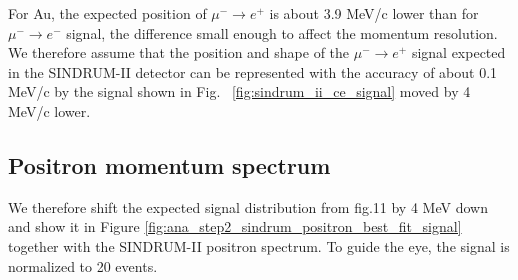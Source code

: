 \documentclass[12pt]{article}
\begin{document}
For Au, the expected position of $\mu^-\rightarrow e^+$ is about 3.9 MeV/c lower than
for $\mu^- \rightarrow e^-$ signal, the difference small enough to affect the momentum
resolution.
%
We therefore assume that the position and shape of the $\mu^-\rightarrow e^+$ signal
expected in the SINDRUM-II detector can be represented with the accuracy
of about 0.1 MeV/c by the signal shown in Fig. ~\ref{fig:sindrum_ii_ce_signal}
moved by 4 MeV/c lower.

\vspace{0.1in}
\vspace{0.1in}

\subsection {Positron momentum spectrum}

We therefore shift the expected signal distribution from fig.11 by 4 MeV down
and show it in Figure \ref{fig:ana_step2_sindrum_positron_best_fit_signal} together
with the SINDRUM-II positron spectrum. To guide the eye, the signal is normalized
to 20 events.
\end{document}
